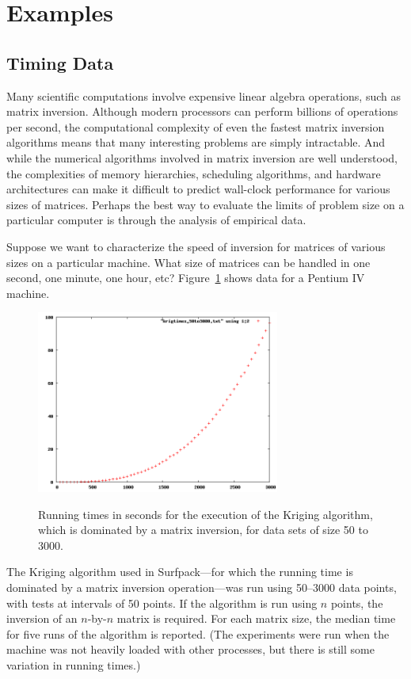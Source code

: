 \documentclass{article}
\begin{document}
\pagebreak
\section{Examples}
\subsection{Timing Data}
Many scientific computations involve expensive linear algebra operations, such
as matrix inversion.  Although modern processors can perform billions of
operations per second, the computational complexity of even the fastest matrix inversion
algorithms means that many interesting problems are simply intractable.  And while the
numerical algorithms involved in matrix inversion are well understood, the
complexities of memory hierarchies, scheduling algorithms, and hardware
architectures can make it difficult to predict wall-clock performance for
various sizes of matrices.  Perhaps the best way to evaluate the limits of
problem size on a particular computer is through the analysis of empirical data.

Suppose we want to characterize the speed of inversion for matrices of various
sizes on a particular machine.  What size of matrices can be handled in one
second, one minute, one hour, etc?  Figure~\ref{fig:kriging_times} shows data for a Pentium IV machine.  

\begin{figure}[htbp]
  \centering 
  \includegraphics[width=8cm]{TimingMatrixOp/kriging_times_50to3000.png}
  \label{fig:kriging_times}
  \caption {Running times in seconds for the execution of the Kriging algorithm, which is dominated by a matrix inversion, for data sets of size 50 to 3000.} 
\end{figure}

The Kriging algorithm used in Surfpack---for which the running time is
dominated by a matrix inversion operation---was run using 50--3000 data points,
with tests at intervals of 50 points.  If the algorithm is run using $n$
points, the inversion of an $n$-by-$n$ matrix is required.  For each matrix
size, the median time for five runs of the algorithm is reported.  (The
experiments were run when the machine was not heavily loaded with other
processes, but there is still some variation in running times.)
\end{document}
